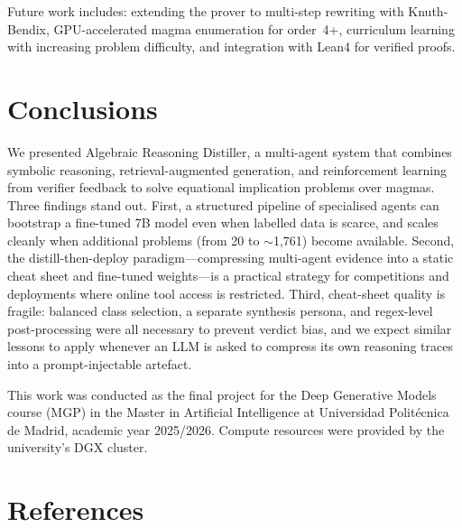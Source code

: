 \documentclass{article}
\begin{document}
Future work includes: extending the prover to multi-step rewriting with Knuth-Bendix, GPU-accelerated magma enumeration for order~4+, curriculum learning with increasing problem difficulty, and integration with Lean4 for verified proofs.

\section{Conclusions}
\label{sec:conclusions}

We presented Algebraic Reasoning Distiller, a multi-agent system that combines symbolic reasoning, retrieval-augmented generation, and reinforcement learning from verifier feedback to solve equational implication problems over magmas. Three findings stand out. First, a structured pipeline of specialised agents can bootstrap a fine-tuned 7B model even when labelled data is scarce, and scales cleanly when additional problems (from 20 to $\sim$1{,}761) become available. Second, the distill-then-deploy paradigm---compressing multi-agent evidence into a static cheat sheet and fine-tuned weights---is a practical strategy for competitions and deployments where online tool access is restricted. Third, cheat-sheet quality is fragile: balanced class selection, a separate synthesis persona, and regex-level post-processing were all necessary to prevent verdict bias, and we expect similar lessons to apply whenever an LLM is asked to compress its own reasoning traces into a prompt-injectable artefact.

\begin{ack}
This work was conducted as the final project for the Deep Generative Models course (MGP) in the Master in Artificial Intelligence at Universidad Polit\'ecnica de Madrid, academic year 2025/2026. Compute resources were provided by the university's DGX cluster.
\end{ack}

\section*{References}
\end{document}
